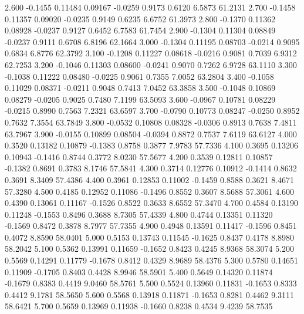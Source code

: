    2.600  -0.1455   0.11484   0.09167  -0.0259   0.9173   0.6120   6.5873  61.2131
   2.700  -0.1458   0.11357   0.09020  -0.0235   0.9149   0.6235   6.6752  61.3973
   2.800  -0.1370   0.11362   0.08928  -0.0237   0.9127   0.6452   6.7583  61.7454
   2.900  -0.1304   0.11304   0.08849  -0.0237   0.9111   0.6708   6.8196  62.1664
   3.000  -0.1304   0.11195   0.08703  -0.0214   0.9095   0.6834   6.8776  62.3792
   3.100  -0.1208   0.11227   0.08618  -0.0216   0.9081   0.7039   6.9312  62.7253
   3.200  -0.1046   0.11303   0.08600  -0.0241   0.9070   0.7262   6.9728  63.1110
   3.300  -0.1038   0.11222   0.08480  -0.0225   0.9061   0.7355   7.0052  63.2804
   3.400  -0.1058   0.11029   0.08371  -0.0211   0.9048   0.7413   7.0452  63.3858
   3.500  -0.1048   0.10869   0.08279  -0.0205   0.9025   0.7480   7.1199  63.5093
   3.600  -0.0967   0.10781   0.08229  -0.0215   0.8990   0.7563   7.2321  63.6597
   3.700  -0.0790   0.10773   0.08247  -0.0250   0.8952   0.7632   7.3554  63.7849
   3.800  -0.0532   0.10808   0.08328  -0.0306   0.8913   0.7638   7.4811  63.7967
   3.900  -0.0155   0.10899   0.08504  -0.0394   0.8872   0.7537   7.6119  63.6127
   4.000   0.3520   0.13182   0.10879  -0.1383   0.8758   0.3877   7.9783  57.7336
   4.100   0.3695   0.13206   0.10943  -0.1416   0.8744   0.3772   8.0230  57.5677
   4.200   0.3539   0.12811   0.10857  -0.1382   0.8691   0.3783   8.1746  57.5841
   4.300   0.3714   0.12776   0.10912  -0.1414   0.8632   0.3691   8.3409  57.4386
   4.400   0.3961   0.12853   0.11002  -0.1459   0.8588   0.3621   8.4671  57.3280
   4.500   0.4185   0.12952   0.11086  -0.1496   0.8552   0.3607   8.5688  57.3061
   4.600   0.4390   0.13061   0.11167  -0.1526   0.8522   0.3633   8.6552  57.3470
   4.700   0.4584   0.13190   0.11248  -0.1553   0.8496   0.3688   8.7305  57.4339
   4.800   0.4744   0.13351   0.11320  -0.1569   0.8472   0.3878   8.7977  57.7355
   4.900   0.4948   0.13591   0.11417  -0.1596   0.8451   0.4072   8.8590  58.0401
   5.000   0.5153   0.13743   0.11545  -0.1625   0.8437   0.4178   8.8980  58.2042
   5.100   0.5362   0.13991   0.11659  -0.1652   0.8423   0.4245   8.9368  58.3074
   5.200   0.5569   0.14291   0.11779  -0.1678   0.8412   0.4329   8.9689  58.4376
   5.300   0.5780   0.14651   0.11909  -0.1705   0.8403   0.4428   8.9946  58.5901
   5.400   0.5649   0.14320   0.11874  -0.1679   0.8383   0.4419   9.0460  58.5761
   5.500   0.5524   0.13960   0.11831  -0.1653   0.8333   0.4412   9.1781  58.5650
   5.600   0.5568   0.13918   0.11871  -0.1653   0.8281   0.4462   9.3111  58.6421
   5.700   0.5659   0.13969   0.11938  -0.1660   0.8238   0.4534   9.4239  58.7535
